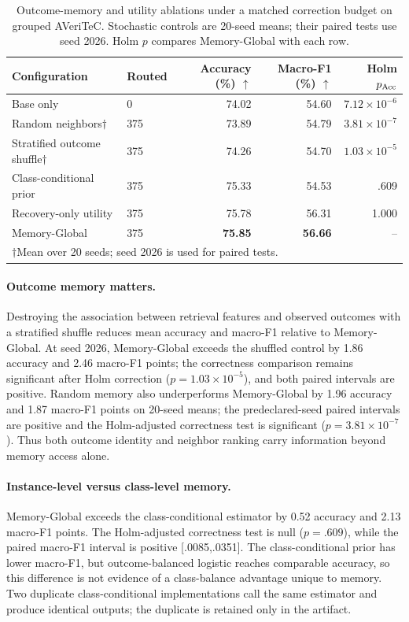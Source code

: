 \documentclass[runningheads]{llncs}
\begin{document}
\begin{table}[t]
\caption{Outcome-memory and utility ablations under a matched correction
budget on grouped AVeriTeC. Stochastic controls are 20-seed means; their
paired tests use seed 2026. Holm $p$ compares Memory-Global with each row.}
\label{tab:memory-ablation}
\centering\small
\begin{tabular}{llrrr}
\toprule
Configuration & Routed & Accuracy (\%) $\uparrow$ & Macro-F1 (\%) $\uparrow$ & Holm $p_{\rm Acc}$ \\
\midrule
Base only & 0 & 74.02 & 54.60 & $7.12{\times}10^{-6}$ \\
Random neighbors$\dagger$ & 375 & 73.89 & 54.79 & $3.81{\times}10^{-7}$ \\
Stratified outcome shuffle$\dagger$ & 375 & 74.26 & 54.70 & $1.03{\times}10^{-5}$ \\
Class-conditional prior & 375 & 75.33 & 54.53 & .609 \\
Recovery-only utility & 375 & 75.78 & 56.31 & 1.000 \\
Memory-Global & 375 & \textbf{75.85} & \textbf{56.66} & -- \\
\bottomrule
\multicolumn{5}{l}{\footnotesize $\dagger$Mean over 20 seeds; seed 2026 is used for paired tests.} \\
\end{tabular}
\end{table}

\paragraph{Outcome memory matters.}
Destroying the association between retrieval features and observed outcomes
with a stratified shuffle reduces mean accuracy and macro-F1 relative to
Memory-Global. At seed 2026, Memory-Global exceeds the shuffled control by
1.86 accuracy and 2.46 macro-F1 points; the correctness
comparison remains significant after Holm correction
($p=1.03\times10^{-5}$), and both paired intervals are positive. Random memory
also underperforms Memory-Global by 1.96 accuracy and 1.87 macro-F1 points on
20-seed means; the predeclared-seed paired intervals are positive and the
Holm-adjusted correctness test is significant
($p=3.81\times10^{-7}$). Thus both outcome identity and neighbor ranking carry
information beyond memory access alone.

\paragraph{Instance-level versus class-level memory.}
Memory-Global exceeds the class-conditional estimator by 0.52 accuracy and 2.13
macro-F1 points. The Holm-adjusted correctness test is null ($p=.609$), while
the paired macro-F1 interval is positive [.0085,.0351]. The class-conditional
prior has lower macro-F1, but outcome-balanced logistic reaches comparable
accuracy, so this difference is not evidence of a class-balance advantage
unique to memory. Two duplicate class-conditional implementations call the same estimator and
produce identical outputs; the duplicate is retained only in the artifact.
\end{document}
